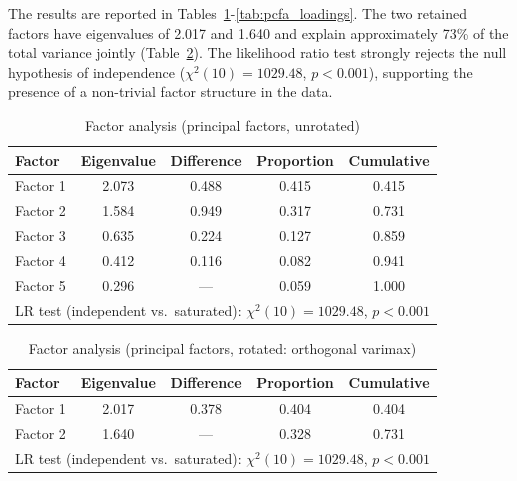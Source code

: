\documentclass[11pt,english,a4paper, twoside, authoryear]{article}
\begin{document}
The results are reported in Tables~\ref{tab:pcfa_unrot}-\ref{tab:pcfa_loadings}. The two retained factors have eigenvalues of 2.017 and 1.640 and explain approximately 73\% of the total variance jointly (Table~\ref{tab:pcfa_rot}). The likelihood ratio test strongly rejects the null hypothesis of independence ($\chi^2(10) = 1029.48$, $p < 0.001$), supporting the presence of a non-trivial factor structure in the data.

\begin{table}[h!]
\centering
\caption{\normalsize Factor analysis (principal factors, unrotated)}
\label{tab:pcfa_unrot}
\vspace{-0.3cm}
\begin{tabular}{lcccc}
\hline
Factor & Eigenvalue & Difference & Proportion & Cumulative \\
\hline
Factor 1 & 2.073 & 0.488 & 0.415 & 0.415 \\
Factor 2 & 1.584 & 0.949 & 0.317 & 0.731 \\
Factor 3 & 0.635 & 0.224 & 0.127 & 0.859 \\
Factor 4 & 0.412 & 0.116 & 0.082 & 0.941 \\
Factor 5 & 0.296 & ---   & 0.059 & 1.000 \\
\hline
\multicolumn{5}{l}{\scriptsize LR test (independent vs.\ saturated): $\chi^2(10) = 1029.48$, $p < 0.001$} \\
\hline
\end{tabular}
\end{table}

\begin{table}[h!]
\centering
\caption{Factor analysis (principal factors, rotated: orthogonal varimax)}
\label{tab:pcfa_rot}
\vspace{-0.3cm}
\begin{tabular}{lcccc}
\hline
Factor & Eigenvalue & Difference & Proportion & Cumulative \\
\hline
Factor 1 & 2.017 & 0.378 & 0.404 & 0.404 \\
Factor 2 & 1.640 & ---   & 0.328 & 0.731 \\
\hline
\multicolumn{5}{l}{\scriptsize LR test (independent vs.\ saturated): $\chi^2(10) = 1029.48$, $p < 0.001$} \\
\hline
\end{tabular}
\end{table}
\end{document}
